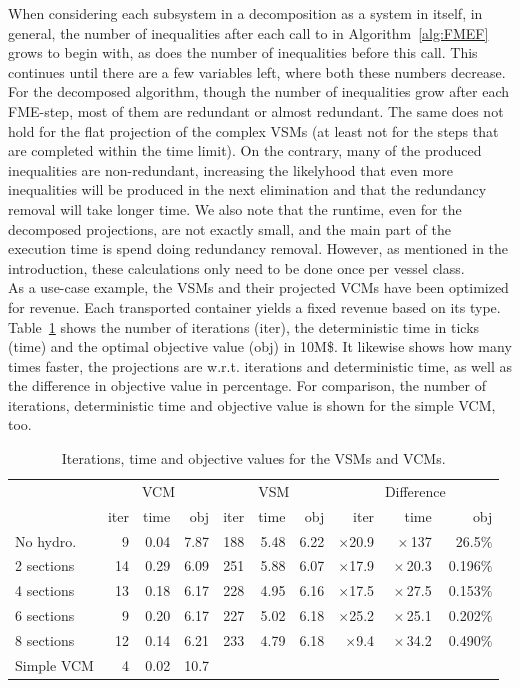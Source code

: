 \documentclass{llncs}
\newcommand{\btablesize}{\begin{scriptsize}}
\newcommand{\etablesize}{\end{scriptsize}}
\begin{document}
\indent When considering each subsystem in a decomposition as a system in itself, in general, the number of inequalities after each call to  in Algorithm~\ref{alg:FMEF} grows to begin with, as does the number of inequalities before this call. This continues until there are a few variables left, where both these numbers decrease. For the decomposed algorithm, though the number of inequalities grow after each FME-step, most of them are redundant or almost redundant. The same does not hold for the flat projection of the complex VSMs (at least not for the steps that are completed within the time limit). On the contrary, many of the produced inequalities are non-redundant, increasing the likelyhood that even more inequalities will be produced in the next elimination and that the redundancy removal will take longer time. We also note that the runtime, even for the decomposed projections, are not exactly small, and the main part of the execution time is spend doing redundancy removal. However, as mentioned in the introduction, these calculations only need to be done once per vessel class. \\
\indent As a use-case example, the VSMs and their projected VCMs have been optimized for revenue. Each transported container yields a fixed revenue based on its type.
 Table~\ref{tab:usingProjections} shows the number of iterations (iter), the deterministic time in ticks (time) and the optimal objective value (obj) in 10M\$. It likewise shows how many times faster, the projections are w.r.t. iterations and deterministic time, as well as the difference in objective value in percentage. For comparison, the number of iterations, deterministic time and objective value is shown for the simple VCM, too.
\begin{table}[tb]
\caption{Iterations, time and objective values for the VSMs and VCMs.}
\label{tab:usingProjections}
\centering
\btablesize
\begin{tabular}{l|r@{\:\;}r@{\:\;}r|r@{\:\;}r@{\:\:\:}r|rrr}
&\multicolumn{3}{c|}{VCM}&\multicolumn{3}{c|}{VSM}&\multicolumn{3}{c}{Difference}\\
					&iter&time  &obj 	 &iter  &time  &obj	&iter 			 &time					&obj\\ 
\hline
No hydro. 	&  9 & 0.04 & 7.87 &	188 & 5.48 &6.22&$\times$20.9&$\:\times$137 &$\:$26.5$\%$\\
2 sections	& 14 & 0.29 & 6.09 &	251 & 5.88 &6.07&$\times$17.9&$\:\times$20.3&$\:$0.196$\%$\\
4 sections 	& 13 & 0.18 & 6.17 &  228 & 4.95 &6.16&$\times$17.5&$\:\times$27.5&$\:$0.153$\%$\\
6 sections 	&  9 & 0.20 & 6.17 &  227 & 5.02 &6.18&$\times$25.2&$\:\times$25.1&$\:$0.202$\%$\\
8 sections 	& 12 & 0.14 & 6.21 &  233 & 4.79 &6.18&$\times$9.4&$\:\times$34.2&$\:$0.490$\%$\\
\bottomrule
Simple VCM&  4 & 0.02 &10.7\phantom{0}\\
\end{tabular}
\etablesize
\end{table}
\end{document}
